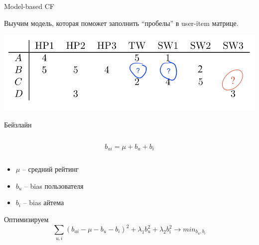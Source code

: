 \documentclass[11pt,aspectratio=169]{beamer}
\begin{document}
\begin{frame}{Model-based CF}

\begin{tcolorbox}[colback=info!5,colframe=info!80,title=Идея]
Выучим модель, которая поможет заполнить ``пробелы'' в user-item матрице.
\end{tcolorbox}

\begin{center}
\includegraphics[scale=0.5]{images/utility-2.png}
\end{center}

\end{frame}

\begin{frame}{Бейзлайн \cite{KOREN}}

\begin{columns}
\begin{column}{0.2\textwidth} 
\end{column}
\begin{column}{0.5\textwidth} 
\begin{tcolorbox}[colback=info!5,colframe=info!80,title=Модель]
\[
b_{ui} = \mu + b_u + b_i
\]
\end{tcolorbox}
\end{column}
\begin{column}{0.2\textwidth} 
\end{column}
\end{columns}

\vfill

\begin{itemize}
\item $\mu$ -- средний рейтинг
\item $b_u$ -- bias пользователя
\item $b_i$ -- bias айтема
\end{itemize}

\vfill

Оптимизируем
\[
\sum_{u, i} (b_{ui} - \mu - b_u - b_i)^2 + \lambda_1 b_u^2 + \lambda_2 b_i^2 \rightarrow min_{b_u, b_i}
\]

\end{frame}
\end{document}
